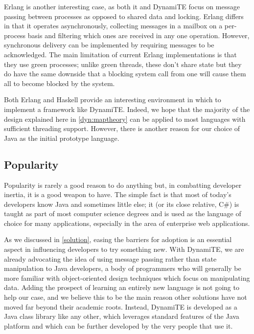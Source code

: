 Erlang\cite{erlang} is another interesting case, as both it and
DynamiTE focus on message passing between processes as opposed to
shared data and locking.  Erlang differs in that it operates
asynchronously, collecting messages in a mailbox on a per-process
basis and filtering which ones are received in any one operation.
However, synchronous delivery can be implemented by requiring messages
to be acknowledged.  The main limitation of current Erlang
implementations is that they use green processes; unlike green
threads, these don't share state but they do have the same downside
that a blocking system call from one will cause them all to become
blocked by the system.

Both Erlang and Haskell provide an interesting environment in which to
implement a framework like DynamiTE.  Indeed, we hope that the
majority of the design explained here in \ref{dyn:maptheory} can be
applied to most languages with sufficient threading support.  However,
there is another reason for our choice of Java as the initial
prototype language.

\subsection{Popularity}

Popularity is rarely a good reason to do anything but, in combatting
developer inertia, it is a good weapon to have.  The simple fact is
that most of today's developers know Java and sometimes little else;
it (or its close relative, C\#) is taught as part of most computer
science degrees and is used as the language of choice for many
applications, especially in the area of enterprise web applications.

As we discussed in \ref{solution}, easing the barriers for adoption is
an essential aspect in influencing developers to try something new.
With DynamiTE, we are already advocating the idea of using message
passing rather than state manipulation to Java developers, a body of
programmers who will generally be more familiar with object-oriented
design techniques which focus on manipulating data.  Adding the
prospect of learning an entirely new language is not going to help our
case, and we believe this to be the main reason other solutions have
not moved far beyond their academic roots.  Instead, DynamiTE is
developed as a Java class library like any other, which leverages
standard features of the Java platform and which can be further
developed by the very people that use it.

